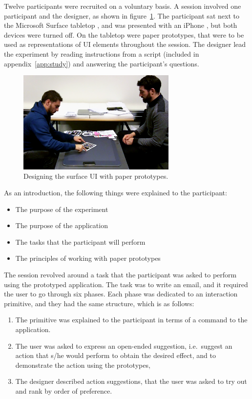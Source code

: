 Twelve participants were recruited on a voluntary basis.
A session involved one participant and the designer, as shown in figure~\ref{fig:studyScreenshot}.
The participant sat next to the Microsoft Surface tabletop \citep{ms}, and was presented with an iPhone \citep{iphone}, but both devices were turned off.
On the tabletop were paper prototypes, that were to be used as representations of UI elements throughout the session.
The designer lead the experiment by reading instructions from a script (included in appendix~\ref{app:study}) and answering the participant's questions.

\begin{figure}[htb]
  \centering
    \includegraphics[width=0.7\textwidth]{images/studyScreenshot}
  \caption{Designing the surface UI with paper prototypes.}
  \label{fig:studyScreenshot}
\end{figure}

As an introduction, the following things were explained to the participant:
\begin{itemize}
\item The purpose of the experiment
\item The purpose of the application
\item The tasks that the participant will perform
\item The principles of working with paper prototypes
\end{itemize}
\hfill
\linebreak
The session revolved around a task that the participant was asked to perform using the prototyped application.
The task was to write an email, and it required the user to go through six phases.
Each phase was dedicated to an interaction primitive, and they had the same structure, which is as follows:
\begin{enumerate}
\item The primitive was explained to the participant in terms of a command to the application.
\item The user was asked to express an open-ended suggestion, i.e.\ suggest an action that s/he would perform to obtain the desired effect, and to demonstrate the action using the prototypes,
\item The designer described action suggestions, that the user was asked to try out and rank by order of preference.
\end{enumerate}

